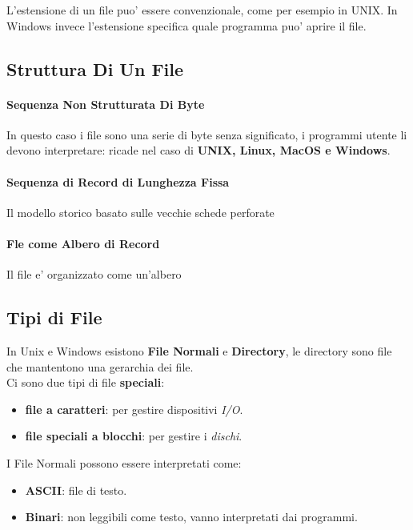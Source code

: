 L'estensione di un file puo' essere convenzionale, come per esempio in UNIX. In Windows invece 
l'estensione specifica quale programma puo' aprire il file.

\subsection{Struttura Di Un File}
\paragraph{Sequenza Non Strutturata Di Byte}
In questo caso i file sono una serie di byte senza significato, i programmi utente li devono interpretare: ricade nel caso di 
\textbf{UNIX, Linux, MacOS e Windows}.

\paragraph{Sequenza di Record di Lunghezza Fissa}
Il modello storico basato sulle vecchie schede perforate

\paragraph{Fle come Albero di Record}
Il file e' organizzato come un'albero

\subsection{Tipi di File}
In Unix e Windows esistono \textbf{File Normali} e \textbf{Directory}, le directory sono file che mantentono
una gerarchia dei file. \\
Ci sono due tipi di file \textbf{speciali}:
\begin{itemize}
    \item \textbf{file a caratteri}: per gestire dispositivi \textit{I/O}.
    \item \textbf{file speciali a blocchi}: per gestire i \textit{dischi}.
\end{itemize}

I File Normali possono essere interpretati come:
\begin{itemize}
    \item \textbf{ASCII}: file di testo.
    \item \textbf{Binari}: non leggibili come testo, vanno interpretati dai programmi.
\end{itemize}

